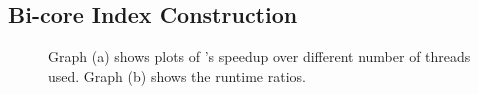
\subsection{Bi-core Index Construction}\label{sec:exp-index-cons}

\begin{figure}%
    \centering
    \qquad
    \caption{Graph (a) shows plots of 's speedup over different number of threads used. Graph (b) shows the runtime ratios.}%
    \label{fig:speedup:c}%
\end{figure}

